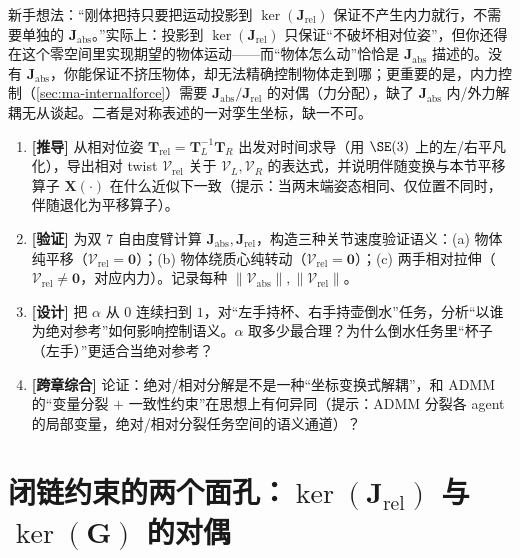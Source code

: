 \begin{pitfall}
新手想法：“刚体把持只要把运动投影到 $\ker(\mathbf{J}_{\text{rel}})$ 保证不产生内力就行，不需要单独的 $\mathbf{J}_{\text{abs}}$。”实际上：投影到 $\ker(\mathbf{J}_{\text{rel}})$ 只保证“不破坏相对位姿”，但你还得在这个零空间里实现期望的物体运动——而“物体怎么动”恰恰是 $\mathbf{J}_{\text{abs}}$ 描述的。没有 $\mathbf{J}_{\text{abs}}$，你能保证不挤压物体，却无法精确控制物体走到哪；更重要的是，内力控制（\cref{sec:ma-internalforce}）需要 $\mathbf{J}_{\text{abs}}/\mathbf{J}_{\text{rel}}$ 的对偶（力分配），缺了 $\mathbf{J}_{\text{abs}}$ 内/外力解耦无从谈起。二者是对称表述的一对孪生坐标，缺一不可。
\end{pitfall}

\begin{exercise}
\begin{enumerate}
  \item \textbf{[推导]} 从相对位姿 $\mathbf{T}_{\text{rel}}=\mathbf{T}_L^{-1}\mathbf{T}_R$ 出发对时间求导（用 $\SE(3)$ 上的左/右平凡化），导出相对 twist $\boldsymbol{\mathcal{V}}_{\text{rel}}$ 关于 $\boldsymbol{\mathcal{V}}_L,\boldsymbol{\mathcal{V}}_R$ 的表达式，并说明伴随变换与本节平移算子 $\mathbf{X}(\cdot)$ 在什么近似下一致（提示：当两末端姿态相同、仅位置不同时，伴随退化为平移算子）。
  \item \textbf{[验证]} 为双 $7$ 自由度臂计算 $\mathbf{J}_{\text{abs}},\mathbf{J}_{\text{rel}}$，构造三种关节速度验证语义：(a) 物体纯平移（$\boldsymbol{\mathcal{V}}_{\text{rel}}=\mathbf{0}$）；(b) 物体绕质心纯转动（$\boldsymbol{\mathcal{V}}_{\text{rel}}=\mathbf{0}$）；(c) 两手相对拉伸（$\boldsymbol{\mathcal{V}}_{\text{rel}}\neq\mathbf{0}$，对应内力）。记录每种 $\|\boldsymbol{\mathcal{V}}_{\text{abs}}\|,\|\boldsymbol{\mathcal{V}}_{\text{rel}}\|$。
  \item \textbf{[设计]} 把 $\alpha$ 从 $0$ 连续扫到 $1$，对“左手持杯、右手持壶倒水”任务，分析“以谁为绝对参考”如何影响控制语义。$\alpha$ 取多少最合理？为什么倒水任务里“杯子（左手）”更适合当绝对参考？
  \item \textbf{[跨章综合]} 论证：绝对/相对分解是不是一种“坐标变换式解耦”，和 ADMM 的“变量分裂 $+$ 一致性约束”在思想上有何异同（提示：ADMM 分裂各 agent 的局部变量，绝对/相对分裂任务空间的语义通道）？
\end{enumerate}
\end{exercise}

\section{闭链约束的两个面孔：$\ker(\mathbf{J}_{\text{rel}})$ 与 $\ker(\mathbf{G})$ 的对偶}
\label{sec:ma-duality}

